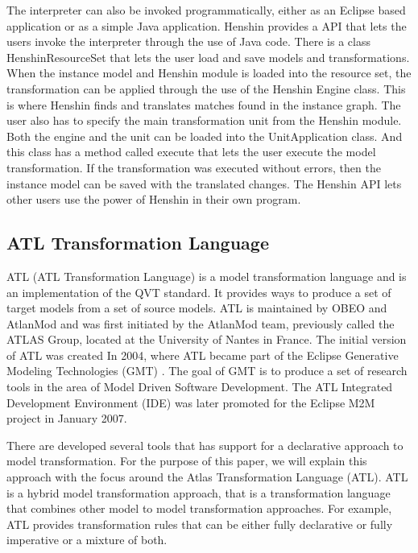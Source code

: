 The interpreter can also be invoked programmatically, either as an
Eclipse based application or as a simple Java application. Henshin provides a
API that lets the users invoke the interpreter through the use of Java code.
There is a class HenshinResourceSet that lets the user load and save models and
transformations. When the instance model and Henshin module is loaded into the
resource set, the transformation can be applied through the use of the Henshin
Engine class. This is where Henshin finds and translates matches found in the
instance graph. The user also has to specify the main transformation unit from
the Henshin module. Both the engine and the unit can be loaded into the
UnitApplication class. And this class has a method called execute that lets the
user execute the model transformation. If the transformation was executed
without errors, then the instance model can be saved with the translated
changes. The Henshin API lets other users use the power of Henshin in their own
program.

\subsection{ATL Transformation Language}

ATL\cite{ATL} (ATL Transformation Language) is a model transformation
language and is an implementation of the QVT\cite{QVT} standard. It
provides ways to produce a set of target models from a set of source models.
ATL is maintained by OBEO\cite{OBEO} and AtlanMod\cite{ATLANMod} and was first
initiated by the AtlanMod team, previously called the ATLAS Group, located at
the University of Nantes in France. The initial version of ATL was created In
2004, where ATL became part of the Eclipse Generative Modeling Technologies
(GMT) \cite{GMT}. The goal of GMT is to produce a set of research tools in the
area of Model Driven Software Development. The ATL Integrated Development
Environment (IDE) was later promoted for the Eclipse M2M project in January
2007.

There are developed several tools that has support for a declarative
approach to model transformation. For the purpose of this paper, we will explain
this approach with the focus around the Atlas Transformation Language (ATL).
ATL is a hybrid model transformation approach, that is a transformation
language that combines other model to model transformation approaches. For
example, ATL provides transformation rules that can be either fully declarative
or fully imperative or a mixture of both. 

